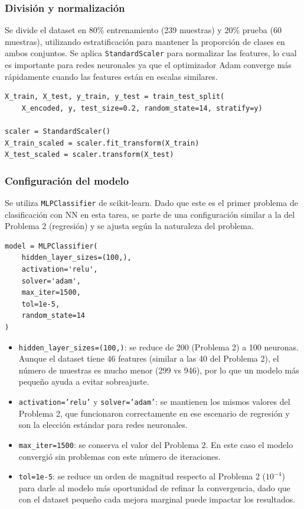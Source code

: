 \documentclass{article}
\begin{document}
\subsubsection{División y normalización}

Se divide el dataset en 80\% entrenamiento (239 muestras) y 20\% prueba (60 muestras), utilizando estratificación para mantener la proporción de clases en ambos conjuntos. Se aplica \texttt{StandardScaler} para normalizar las features, lo cual es importante para redes neuronales ya que el optimizador Adam converge más rápidamente cuando las features están en escalas similares.

\begin{lstlisting}
X_train, X_test, y_train, y_test = train_test_split(
    X_encoded, y, test_size=0.2, random_state=14, stratify=y)

scaler = StandardScaler()
X_train_scaled = scaler.fit_transform(X_train)
X_test_scaled = scaler.transform(X_test)
\end{lstlisting}

\subsubsection{Configuración del modelo}

Se utiliza \texttt{MLPClassifier} de scikit-learn. Dado que este es el primer problema de clasificación con NN en esta tarea, se parte de una configuración similar a la del Problema 2 (regresión) y se ajusta según la naturaleza del problema.

\begin{lstlisting}
model = MLPClassifier(
    hidden_layer_sizes=(100,),
    activation='relu',
    solver='adam',
    max_iter=1500,
    tol=1e-5,
    random_state=14
)
\end{lstlisting}

\begin{itemize}
    \item \texttt{hidden\_layer\_sizes=(100,)}: se reduce de 200 (Problema 2) a 100 neuronas. Aunque el dataset tiene 46 features (similar a las 40 del Problema 2), el número de muestras es mucho menor (299 vs 946), por lo que un modelo más pequeño ayuda a evitar sobreajuste.
    \item \texttt{activation='relu'} y \texttt{solver='adam'}: se mantienen los mismos valores del Problema 2, que funcionaron correctamente en ese escenario de regresión y son la elección estándar para redes neuronales.
    \item \texttt{max\_iter=1500}: se conserva el valor del Problema 2. En este caso el modelo convergió sin problemas con este número de iteraciones.
    \item \texttt{tol=1e-5}: se reduce un orden de magnitud respecto al Problema 2 ($10^{-4}$) para darle al modelo más oportunidad de refinar la convergencia, dado que con el dataset pequeño cada mejora marginal puede impactar los resultados.
\end{itemize}
\end{document}

